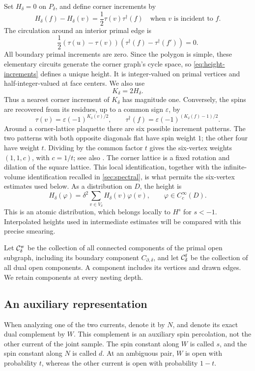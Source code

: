 Set \(H_\delta=0\) on \(P_\delta\), and define corner increments by
\begin{equation}\label{eq:height-increments}
 H_\delta(f)-H_\delta(v)=\frac12\tau(v)\tau^\dagger(f)
 \quad\text{when \(v\) is incident to \(f\)}.
\end{equation}
The circulation around an interior primal edge is
\[
 \frac12(\tau(u)-\tau(v))
              (\tau^\dagger(f)-\tau^\dagger(f'))=0.
\]
All boundary primal increments are zero. Since the polygon is simple,
these elementary circuits generate the corner graph's cycle space,
so \cref{eq:height-increments} defines a unique height.
It is integer-valued on primal vertices and half-integer-valued at face
centers. We also use
\[
 K_\delta=2H_\delta.
\]
Thus a nearest corner increment of \(K_\delta\) has magnitude one.
Conversely, the spins are recovered from its residues, up to a common
sign \(\varepsilon\), by
\[
 \tau(v)=\varepsilon(-1)^{K_\delta(v)/2},\qquad
 \tau^\dagger(f)=\varepsilon(-1)^{(K_\delta(f)-1)/2}.
\]
Around a corner-lattice plaquette there are six possible increment
patterns. The two patterns with both opposite diagonals flat have spin
weight \(1\); the other four have weight \(t\). Dividing by the common
factor \(t\) gives the six-vertex weights \((1,1,c)\), with \(c=1/t\);
see also \cite[Section~2.2, Corollary~2.5]{Lis2022Spins}.
The corner lattice is a fixed rotation and dilation of the square
lattice. This local identification, together with the infinite-volume
identification recalled in \cref{sec:spectral}, is what permits the
six-vertex estimates used below.
As a distribution on \(D\), the height is
\begin{equation}\label{eq:height-smearing}
 H_\delta(\varphi)=\delta^2
       \sum_{v\in V_\delta}H_\delta(v)\varphi(v),
 \qquad \varphi\in C_c^\infty(D).
\end{equation}
This is an atomic distribution, which belongs locally to \(H^s\) for
\(s<-1\). Interpolated heights used in intermediate estimates will be
compared with this precise smearing.

Let \(\mathcal C_\delta^{\rm w}\) be the collection of all connected components
of the primal open subgraph, including its boundary component
\(C_{\partial,\delta}\), and let \(\mathcal C_\delta^{\rm f}\) be the collection
of all dual open components. A component includes its vertices and drawn
edges. We retain components at every nesting depth.

\subsection{An auxiliary representation}\label{subsec:auxiliary}
When analyzing one of the two currents, denote it by \(N\), and denote
its exact dual complement by \(W\). This complement is an auxiliary
spin percolation, not the other current of the joint sample.
The spin constant along \(W\) is called \(s\), and the spin constant
along \(N\) is called \(d\). At an ambiguous pair, \(W\) is open with
probability \(t\), whereas the other current is open with probability
\(1-t\).

